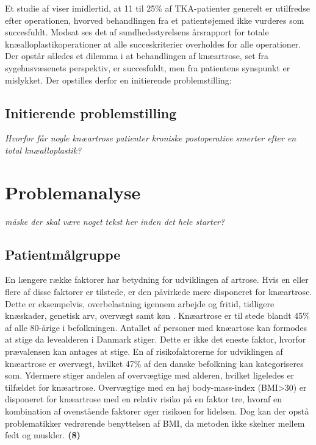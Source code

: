 Et studie af \cite{Bourne2010} viser imidlertid, at 11 til 25\% af TKA-patienter generelt er utilfredse efter operationen, hvorved behandlingen fra et patientøjemed ikke vurderes som succesfuldt.
Modsat ses det af sundhedsstyrelsens årsrapport for totale knæalloplastikoperationer at alle succeskriterier overholdes for alle operationer. \citep{aarsrapport2016} 
Der opstår således et dilemma i at behandlingen af knæartrose, set fra sygehusvæsenets perspektiv, er succesfuldt, men fra patientens synspunkt er mislykket.
Der opstilles derfor en initierende problemstilling:

\subsection*{Initierende problemstilling}
\begin{center}
	\textit{Hvorfor får nogle knæartrose patienter kroniske postoperative smerter efter en total knæalloplastik?}
\end{center}


\section{Problemanalyse}
\textit{måske der skal være noget tekst her inden det hele starter?}

\subsection{Patientmålgruppe}

En længere række faktorer har betydning for udviklingen af artrose. Hvis en eller flere af disse faktorer er tilstede, er den påvirkede mere disponeret for knæartrose. Dette er eksempelvis, overbelastning igennem arbejde og fritid, tidligere knæskader, genetisk arv, overvægt samt køn \citep{brostrom2012}. Knæartrose er til stede blandt 45\% af alle 80-årige i befolkningen. Antallet af personer med knæartose kan formodes at stige da levealderen i Danmark stiger. Dette er ikke det eneste faktor, hvorfor prævalensen kan antages at stige. En af risikofaktorerne for udviklingen af knæartrose er overvægt, hvilket 47\% af den danske befolkning kan kategoriseres som. Ydermere stiger andelen af overvægtige med alderen, hvilket ligeledes er tilfældet for knæartrose. Overvægtige med en høj body-mass-index (BMI>30\citep{definitionfedme1999}) er disponeret for knæartrose med en relativ risiko på en faktor tre, hvoraf en kombination af ovenstående faktorer øger risikoen for lidelsen. Dog kan der opstå problematikker vedrørende benyttelsen af BMI, da metoden ikke skelner mellem fedt og muskler. \textbf{(8)} \citep{brostrom2012} \citep{Vestergaard2014} \citep{Vestergaard2016} \citep{Lind2016} \citep{Lind2016b}

